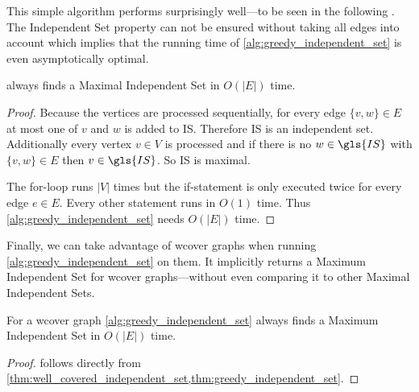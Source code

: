 This simple algorithm performs surprisingly well---to be seen in the
following . The Independent Set
property can not be ensured without taking all edges into account
which implies that the running time of
\cref{alg:greedy_independent_set} is even asymptotically optimal.

\begin{theorem}
  \label{thm:greedy_independent_set}
   always finds a
  Maximal Independent Set in \(O(|E|)\) time.
  \begin{proof}
  Because the vertices are processed sequentially, for every edge
  \(\{v,w\} \in E\) at most one of \(v\) and \(w\) is added to
  \gls{IS}. Therefore \gls{IS} is an independent set. Additionally 
  every vertex \(v \in V\) is processed and if there is no
  \(w \in \gls{IS}\) with \(\{v,w\} \in E\) then \(v \in \gls{IS}\).
  So \gls{IS} is maximal.
  
  The for-loop runs \(|V|\) times but the if-statement is only
  executed twice for every edge \(e \in E\). Every other statement
  runs in \(O(1)\) time. Thus \cref{alg:greedy_independent_set} needs
  \(O(|E|)\) time.
  \end{proof}
\end{theorem}

Finally, we can take advantage of \gls{wcover} graphs when running
\cref{alg:greedy_independent_set} on them. It implicitly returns a
Maximum Independent Set for \gls{wcover} graphs---without even
comparing it to other Maximal Independent Sets.

\begin{theorem}
  \label{thm:well_covered_maximum_independent_set}
  For a \gls{wcover} graph \cref{alg:greedy_independent_set} always
  finds a Maximum Independent Set in \(O(|E|)\) time.
  \begin{proof}
   follows directly
  from \cref{thm:well_covered_independent_set,thm:greedy_independent_set}.
  \end{proof}
\end{theorem}

